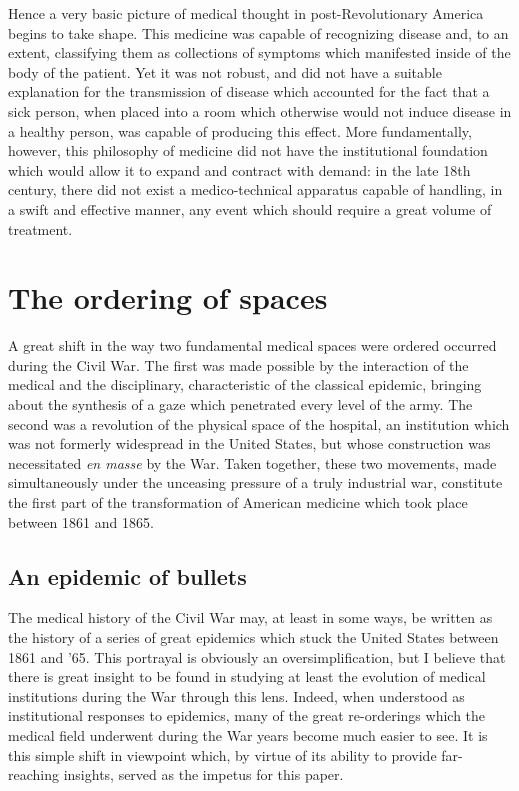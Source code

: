 \documentclass[12pt]{article}
\begin{document}
Hence a very basic picture of medical thought in post-Revolutionary America begins to take shape. This medicine was capable of recognizing disease and,
to an extent, classifying them as collections of symptoms which manifested inside of the body of the patient. Yet it was not robust, and did
not have a suitable explanation for the transmission of disease which accounted for the fact that a sick person, when placed into a room which
otherwise would not induce disease in a healthy person, was capable of producing this effect. More fundamentally, however, this philosophy of
medicine did not have the institutional foundation which would allow it to expand and contract with demand: in the late 18th century, there did
not exist a medico-technical apparatus capable of handling, in a swift and effective manner, any event which should require a great volume of
treatment.

\renewcommand{\thesec}{The ordering of spaces}
\section{\thesec} \label{sec:spaces}
A great shift in the way two fundamental medical spaces were ordered occurred during the Civil War. The first was made possible by the
interaction of the medical and the disciplinary, characteristic of the classical epidemic, bringing about the synthesis of a gaze which
penetrated every level of the army. The second was a revolution of the physical space of the hospital, an institution which was not
formerly widespread in the United States, but whose construction was necessitated \textit{en masse} by the War. Taken together, these
two movements, made simultaneously under the unceasing pressure of a truly industrial war, constitute the first part of the transformation
of American medicine which took place between 1861 and 1865.

\subsection{An epidemic of bullets}
The medical history of the Civil War may, at least in some ways, be written as the history of a series of great epidemics which stuck the
United States between 1861 and '65. This portrayal is obviously an oversimplification, but I believe that there is great insight to be found
in studying at least the evolution of medical institutions during the War through this lens. Indeed, when understood as institutional responses to epidemics,
many of the great re-orderings which the medical field underwent during the War years become much easier to see. It is this simple shift in
viewpoint which, by virtue of its ability to provide far-reaching insights, served as the impetus for this paper.
\end{document}
